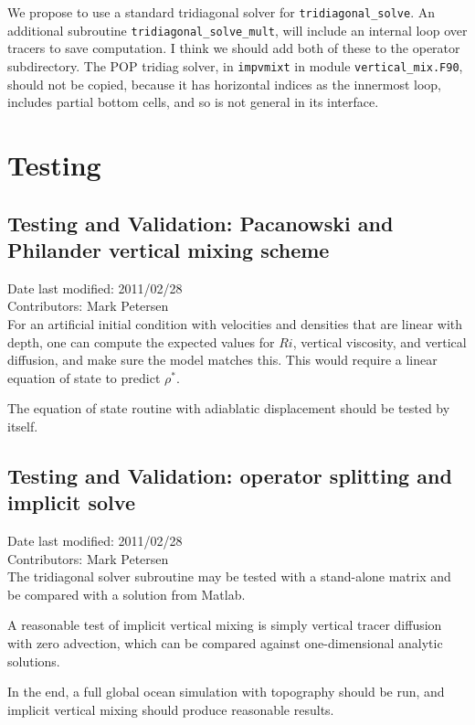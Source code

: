 \documentclass[11pt]{report}
\begin{document}
We propose to use a standard tridiagonal solver for \verb=tridiagonal_solve=.  An additional subroutine \verb=tridiagonal_solve_mult=, will include an internal loop over tracers to save computation.  I think we should add both of these to the operator subdirectory.  The POP tridiag solver, in \verb=impvmixt= in module \verb=vertical_mix.F90=, should not be copied, because it has horizontal indices as the innermost loop, includes partial bottom cells, and so is not general in its interface.


\chapter{Testing}

\section{Testing and Validation: Pacanowski and Philander vertical mixing scheme}
Date last modified: 2011/02/28 \\
Contributors: Mark Petersen \\

For an artificial initial condition with velocities and densities that are linear with depth, one can compute the expected values for $Ri$, vertical viscosity, and vertical diffusion, and make sure the model matches this.  This would require a linear equation of state to predict $\rho^*$.

The equation of state routine with adiablatic displacement should be tested by itself.

\section{Testing and Validation: operator splitting and implicit solve}
Date last modified: 2011/02/28 \\
Contributors: Mark Petersen \\

The tridiagonal solver subroutine may be tested with a stand-alone matrix and be compared with a solution from Matlab.

A reasonable test of implicit vertical mixing is simply vertical tracer diffusion with zero advection, which can be compared against one-dimensional analytic solutions.  

In the end, a full global ocean simulation with topography should be run, and implicit vertical mixing should produce reasonable results.

\end{document}
